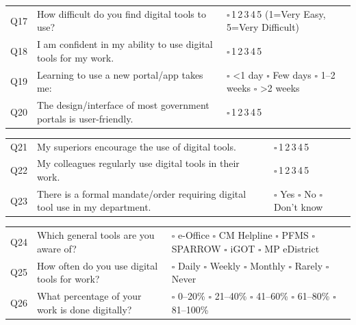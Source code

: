 \documentclass[10pt,a4paper]{article}
\newcommand{\likert}{{\Large$\square$}\,1\quad{\Large$\square$}\,2\quad{\Large$\square$}\,3\quad{\Large$\square$}\,4\quad{\Large$\square$}\,5}
\begin{document}
\vspace{4pt}
\vspace{3pt}

\noindent\begin{tabularx}{\textwidth}{@{}L{0.5cm} X L{5.5cm}@{}}
Q17 & How difficult do you find digital tools to use? & \likert{} {\scriptsize(1=Very Easy, 5=Very Difficult)} \\[3pt]
Q18 & I am confident in my ability to use digital tools for my work. & \likert \\[3pt]
Q19 & Learning to use a new portal/app takes me: & {\Large$\square$} <1 day {\Large$\square$} Few days {\Large$\square$} 1--2 weeks {\Large$\square$} >2 weeks \\[3pt]
Q20 & The design/interface of most government portals is user-friendly. & \likert \\
\end{tabularx}

\vspace{4pt}
\vspace{3pt}

\noindent\begin{tabularx}{\textwidth}{@{}L{0.5cm} X L{5.5cm}@{}}
Q21 & My superiors encourage the use of digital tools. & \likert \\[3pt]
Q22 & My colleagues regularly use digital tools in their work. & \likert \\[3pt]
Q23 & There is a formal mandate/order requiring digital tool use in my department. & {\Large$\square$} Yes {\Large$\square$} No {\Large$\square$} Don't know \\
\end{tabularx}

\vspace{4pt}
\vspace{3pt}

\noindent\begin{tabularx}{\textwidth}{@{}L{0.5cm} X L{5.5cm}@{}}
Q24 & Which general tools are you aware of? & {\Large$\square$} e-Office {\Large$\square$} CM Helpline {\Large$\square$} PFMS {\Large$\square$} SPARROW {\Large$\square$} iGOT {\Large$\square$} MP eDistrict \\[3pt]
Q25 & How often do you use digital tools for work? & {\Large$\square$} Daily {\Large$\square$} Weekly {\Large$\square$} Monthly {\Large$\square$} Rarely {\Large$\square$} Never \\[3pt]
Q26 & What percentage of your work is done digitally? & {\Large$\square$} 0--20\% {\Large$\square$} 21--40\% {\Large$\square$} 41--60\% {\Large$\square$} 61--80\% {\Large$\square$} 81--100\% \\
\end{tabularx}
\end{document}
